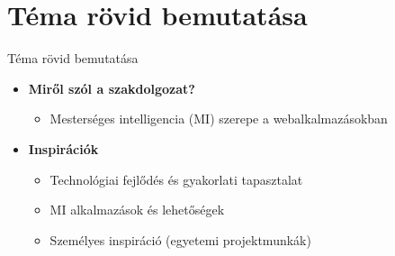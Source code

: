 \documentclass[11pt]{beamer}
\begin{document}
\section{Téma rövid bemutatása}
\begin{frame}{Téma rövid bemutatása}
    \begin{itemize}
        \item \textbf{Miről szól a szakdolgozat?}
        \begin{itemize}
            \vspace{0.5em}
            \item Mesterséges intelligencia (MI) szerepe a webalkalmazásokban
        \end{itemize}
        
        \vspace{0.75em}
        
        \item \textbf{Inspirációk}
        \begin{itemize}
            \vspace{0.5em}
            \item Technológiai fejlődés és gyakorlati tapasztalat
            \vspace{0.5em}
            \item MI alkalmazások és lehetőségek
            \vspace{0.5em}
            \item Személyes inspiráció (egyetemi projektmunkák)
        \end{itemize}
        
        \vspace{0.75em}
        

\end{itemize}
\end{frame}
\end{document}
